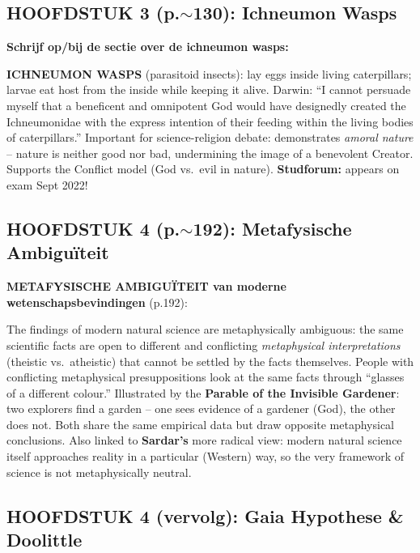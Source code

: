 \documentclass[a4paper,10pt]{article}
\begin{document}
\vspace{3pt}

\subsection{HOOFDSTUK 3 (\texorpdfstring{p.$\sim$130}{p.~130}): Ichneumon Wasps}

\textbf{Schrijf op/bij de sectie over de ichneumon wasps:}

\textbf{ICHNEUMON WASPS} (parasitoid insects): lay eggs inside living caterpillars; larvae eat host from the inside while keeping it alive. Darwin: ``I cannot persuade myself that a beneficent and omnipotent God would have designedly created the Ichneumonidae with the express intention of their feeding within the living bodies of caterpillars.'' Important for science-religion debate: demonstrates \textit{amoral nature} -- nature is neither good nor bad, undermining the image of a benevolent Creator. Supports the Conflict model (God vs.\ evil in nature). \textbf{Studforum:} appears on exam Sept 2022!

\vspace{3pt}

\subsection{HOOFDSTUK 4 (\texorpdfstring{p.$\sim$192}{p.~192}): Metafysische Ambiguïteit}

\textbf{METAFYSISCHE AMBIGUÏTEIT van moderne wetenschapsbevindingen} (p.192):

The findings of modern natural science are metaphysically ambiguous: the same scientific facts are open to different and conflicting \textit{metaphysical interpretations} (theistic vs.\ atheistic) that cannot be settled by the facts themselves. People with conflicting metaphysical presuppositions look at the same facts through ``glasses of a different colour.'' Illustrated by the \textbf{Parable of the Invisible Gardener}: two explorers find a garden -- one sees evidence of a gardener (God), the other does not. Both share the same empirical data but draw opposite metaphysical conclusions. Also linked to \textbf{Sardar's} more radical view: modern natural science itself approaches reality in a particular (Western) way, so the very framework of science is not metaphysically neutral.

\vspace{3pt}

\subsection{HOOFDSTUK 4 (vervolg): Gaia Hypothese \& Doolittle}
\end{document}
